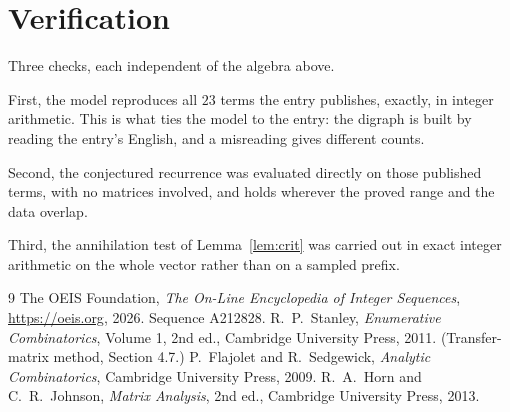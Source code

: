\documentclass[11pt,a4paper]{article}
\theoremstyle{plain}
\theoremstyle{definition}
\begin{document}
\section{Verification}

Three checks, each independent of the algebra above.

First, the model reproduces all $23$ terms the entry publishes, exactly, in integer
arithmetic. This is what ties the model to the entry: the digraph is built by reading the
entry's English, and a misreading gives different counts.

Second, the conjectured recurrence was evaluated directly on those published terms, with no
matrices involved, and holds wherever the proved range and the data overlap.

Third, the annihilation test of Lemma~\ref{lem:crit} was carried out in exact integer
arithmetic on the whole vector rather than on a sampled prefix.

\begin{thebibliography}{9}
 The OEIS Foundation, \emph{The On-Line Encyclopedia of Integer
Sequences}, \url{https://oeis.org}, 2026. Sequence A212828.
 R.~P.~Stanley, \emph{Enumerative Combinatorics}, Volume 1, 2nd ed.,
Cambridge University Press, 2011. (Transfer-matrix method, Section 4.7.)
 P.~Flajolet and R.~Sedgewick, \emph{Analytic Combinatorics}, Cambridge
University Press, 2009.
 R.~A.~Horn and C.~R.~Johnson, \emph{Matrix Analysis}, 2nd ed., Cambridge
University Press, 2013.
\end{thebibliography}
\end{document}
